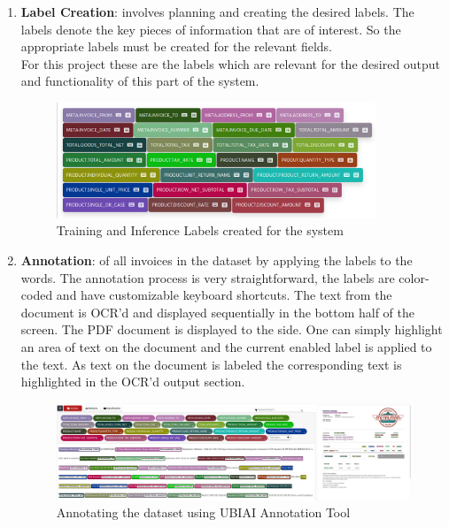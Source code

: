 \begin{enumerate}
	\item \textbf{Label Creation}: involves planning and creating the desired labels. The labels denote the key pieces of information
	      that are of interest. So the appropriate labels must be created for the relevant fields.\\
	      For this project these are the labels which are relevant for the desired output and functionality of this part of the system.
	      \begin{figure}[H]
		      \centering
		      \includegraphics[width=0.9\textwidth]{figures/training_labels.png}
		      \caption{Training and Inference Labels created for the system}
		      \label{fig:training_labels}
	      \end{figure}
	\item \textbf{Annotation}: of all invoices in the dataset by applying the labels to the words. The annotation process is
	      very straightforward, the labels are color-coded and have customizable keyboard shortcuts. The text from the document
	      is OCR'd and displayed sequentially in the bottom half of the screen. The PDF document is displayed to the side.
	      One can simply highlight an area of text on the document and the current enabled label is applied to the text.
	      As text on the document is labeled the corresponding text is highlighted in the OCR'd output section.
	      \begin{figure}[H]
		      \centering
		      \includegraphics[width=1\textwidth]{figures/ubiai_annotate.png}
		      \caption{Annotating the dataset using UBIAI Annotation Tool}
		      \label{fig:training_annotations}
	      \end{figure}

\end{enumerate}
